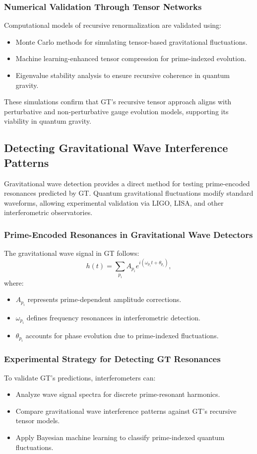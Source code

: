 \documentclass{article}
\theoremstyle{plain}
\begin{document}
\subsubsection{Numerical Validation Through Tensor Networks}
Computational models of recursive renormalization are validated using:
\begin{itemize}
    \item Monte Carlo methods for simulating tensor-based gravitational fluctuations.
    \item Machine learning-enhanced tensor compression for prime-indexed evolution.
    \item Eigenvalue stability analysis to ensure recursive coherence in quantum gravity.
\end{itemize}

These simulations confirm that GT’s recursive tensor approach aligns with perturbative and non-perturbative gauge evolution models, supporting its viability in quantum gravity.

\subsection{Detecting Gravitational Wave Interference Patterns}
Gravitational wave detection provides a direct method for testing prime-encoded resonances predicted by GT. Quantum gravitational fluctuations modify standard waveforms, allowing experimental validation via LIGO, LISA, and other interferometric observatories.

\subsubsection{Prime-Encoded Resonances in Gravitational Wave Detectors}
The gravitational wave signal in GT follows:
\begin{equation}
    h(t) = \sum_{p_i} A_{p_i} e^{i (\omega_{p_i} t + \theta_{p_i})},
\end{equation}
where:
\begin{itemize}
    \item $A_{p_i}$ represents prime-dependent amplitude corrections.
    \item $\omega_{p_i}$ defines frequency resonances in interferometric detection.
    \item $\theta_{p_i}$ accounts for phase evolution due to prime-indexed fluctuations.
\end{itemize}

\subsubsection{Experimental Strategy for Detecting GT Resonances}
To validate GT’s predictions, interferometers can:
\begin{itemize}
    \item Analyze wave signal spectra for discrete prime-resonant harmonics.
    \item Compare gravitational wave interference patterns against GT’s recursive tensor models.
    \item Apply Bayesian machine learning to classify prime-indexed quantum fluctuations.
\end{itemize}
\end{document}
